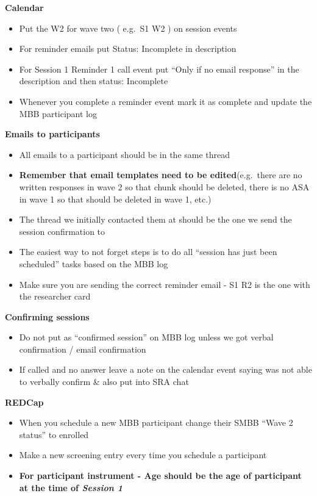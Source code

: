 \documentclass[]{book}
\providecommand{\tightlist}{%
  \setlength{\itemsep}{0pt}\setlength{\parskip}{0pt}}
\begin{document}
\textbf{Calendar}

\begin{itemize}
\tightlist
\item
  Put the W2 for wave two ( e.g.~S1 W2 ) on session events
\item
  For reminder emails put Status: Incomplete in description
\item
  For Session 1 Reminder 1 call event put ``Only if no email response'' in the description and then status: Incomplete
\item
  Whenever you complete a reminder event mark it as complete and update the MBB participant log
\end{itemize}

\textbf{Emails to participants}

\begin{itemize}
\tightlist
\item
  All emails to a participant should be in the same thread\\
\item
  \textbf{Remember that email templates need to be edited}(e.g.~there are no written responses in wave 2 so that chunk should be deleted, there is no ASA in wave 1 so that should be deleted in wave 1, etc.)
\item
  The thread we initially contacted them at should be the one we send the session confirmation to\\
\item
  The easiest way to not forget steps is to do all ``session has just been scheduled'' tasks based on the MBB log\\
\item
  Make sure you are sending the correct reminder email - S1 R2 is the one with the researcher card
\end{itemize}

\textbf{Confirming sessions}

\begin{itemize}
\tightlist
\item
  Do not put as ``confirmed session'' on MBB log unless we got verbal confirmation / email confirmation
\item
  If called and no answer leave a note on the calendar event saying was not able to verbally confirm \& also put into SRA chat
\end{itemize}

\textbf{REDCap}

\begin{itemize}
\tightlist
\item
  When you schedule a new MBB participant change their SMBB ``Wave 2 status'' to enrolled\\
\item
  Make a new screening entry every time you schedule a participant
\item
  \textbf{For participant instrument - Age should be the age of participant at the time of \emph{Session 1} }
\end{itemize}
\end{document}
